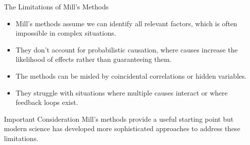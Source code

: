 \documentclass{beamer}
\begin{document}
\begin{frame}{The Limitations of Mill's Methods}
    \begin{itemize}
        \item Mill's methods assume we can identify all relevant factors, which is often impossible in complex situations.
        \item They don't account for probabilistic causation, where causes increase the likelihood of effects rather than guaranteeing them.
        \item The methods can be misled by coincidental correlations or hidden variables.
        \item They struggle with situations where multiple causes interact or where feedback loops exist.
    \end{itemize}
    
    \begin{alertblock}{Important Consideration}
        Mill's methods provide a useful starting point but modern science has developed more sophisticated approaches to address these limitations.
    \end{alertblock}
\end{frame}
\end{document}
